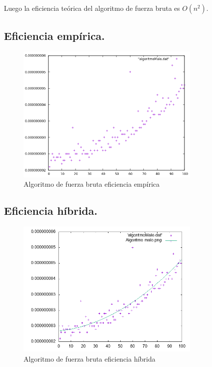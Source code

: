 \documentclass[a4paper, 11pt]{article}
\begin{document}
Luego la eficiencia teórica del algoritmo de fuerza bruta es $O(n^2)$.
\subsection{Eficiencia empírica.}
\begin{figure}[!hbp]
	\includegraphics[width=0.8\textwidth]{algoritmoMalo.png}
	\caption{Algoritmo de fuerza bruta eficiencia empírica	\label{Algoritmo fuerza bruta empírico}}
\end{figure}
\pagebreak
\subsection{Eficiencia híbrida.}
\begin{figure}[!hbp]
	\includegraphics[width=0.8\textwidth]{algoritmoMaloAjuste.png}
	\caption{Algoritmo de fuerza bruta eficiencia híbrida	\label{Algoritmo fuerza bruta hibrido}}
\end{figure}
\end{document}
